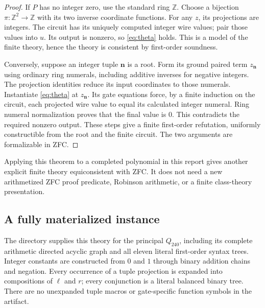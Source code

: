 \documentclass[11pt]{article}
\theoremstyle{remark}\newtheorem{remark}[theorem]{Remark}
\newcommand{\Z}{\mathbb Z}
\newcommand{\code}[1]{\texttt{\detokenize{#1}}}
\begin{document}
\begin{proof}
If $P$ has no integer zero, use the standard ring $\Z$. Choose a
bijection $\pi:\Z^2\to\Z$ with its two inverse coordinate functions.
For any $z$, its projections are integers. The circuit has its uniquely
computed integer wire values; pair those values into $u$. Its output
is nonzero, so \eqref{eq:theta} holds. This is a model of the finite
theory, hence the theory is consistent by first-order soundness.

Conversely, suppose an integer tuple $\boldsymbol n$ is a root.
Form its ground paired term $z_{\boldsymbol n}$ using ordinary ring
numerals, including additive inverses for negative integers.
The projection identities reduce its input coordinates to those
numerals. Instantiate \eqref{eq:theta} at $z_{\boldsymbol n}$.
Its gate equations force, by a finite induction on the circuit,
each projected wire value to equal its calculated integer numeral.
Ring numeral normalization proves that the final value is $0$.
This contradicts the required nonzero output. These steps give a
finite first-order refutation, uniformly constructible from the root
and the finite circuit. The two arguments are formalizable in ZFC.
\end{proof}

Applying this theorem to a completed polynomial in this report gives
another explicit finite theory equiconsistent with ZFC. It does not
need a new arithmetized ZFC proof predicate, Robinson arithmetic, or a
finite class-theory presentation.

\subsection{A fully materialized instance}

The directory \code{finite_theory/} supplies this theory for the principal
$Q_{240}$, including its complete arithmetic directed acyclic graph
and all eleven literal first-order syntax trees. Integer constants are
constructed from $0$ and $1$ through binary addition chains and
negation. Every occurrence of a tuple projection is expanded into
compositions of $\ell$ and $r$; every conjunction is a literal balanced
binary tree. There are no unexpanded tuple macros or gate-specific
function symbols in the artifact.
\end{document}
